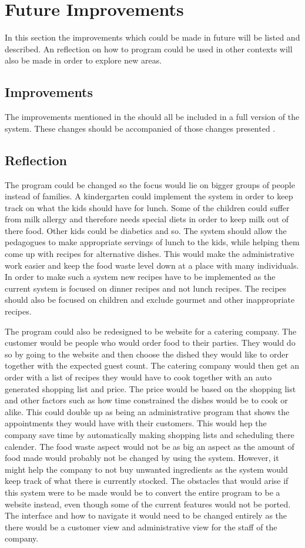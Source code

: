 \section{Future Improvements}
In this section the improvements which could be made in future will be listed and described. An reflection on how to program could be used in other contexts will also be made in order to explore new areas.

\subsection{Improvements}
The improvements mentioned in the  should all be included in a full version of the system. These changes should be accompanied of those changes presented .


\subsection{Reflection}
The program could be changed so the focus would lie on bigger groups of people instead of families. A kindergarten could implement the system in order to keep track on what the kids should have for lunch. Some of the children could suffer from milk allergy and therefore needs special diets in order to keep milk out of there food. Other kids could be diabetics and so. The system should allow the pedagogues to make appropriate servings of lunch to the kids, while helping them come up with recipes for alternative dishes. This would make the administrative work easier and keep the food waste level down at a place with many individuals. In order to make such a system new recipes have to be implemented as the current system is focused on dinner recipes and not lunch recipes. The recipes should also be focused on children and exclude gourmet and other inappropriate recipes.

The program could also be redesigned to be website for a catering company. The customer would be people who would order food to their parties. They would do so by going to the website and then choose the dished they would like to order together with the expected guest count. The catering company would then get an order with a list of recipes they would have to cook together with an auto generated shopping list and price. The price would be based on the shopping list and other factors such as how time constrained the dishes would be to cook or alike. This could double up as being an administrative program that shows the appointments they would have with their customers. This would hep the company save time by automatically making shopping lists and scheduling there calender. The food waste aspect would not be as big an aspect as the amount of food made would probably not be changed by using the system. However, it might help the company to not buy unwanted ingredients as the system would keep track of what there is currently stocked. The obstacles that would arise if this system were to be made would be to convert the entire program to be a website instead, even though some of the current features would not be ported. The interface and how to navigate it would need to be changed entirely as the there would be a customer view and administrative view for the staff of the company. 